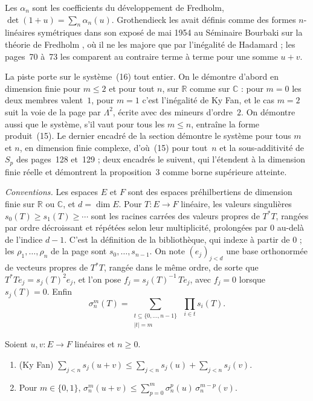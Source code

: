 Les $\alpha_n$ sont les coefficients du développement de Fredholm, $\det(1+u) = \sum_n \alpha_n(u)$. Grothendieck les avait définis comme des formes $n$-linéaires symétriques dans son exposé de mai 1954 au Séminaire Bourbaki sur la théorie de Fredholm \cite{sb91}, où il ne les majore que par l'inégalité de Hadamard ; les pages~70 à~73 les comparent au contraire terme à terme pour une somme $u+v$.

La piste porte sur le système~(16) tout entier. On le démontre d'abord en dimension finie pour $m \leq 2$ et pour tout $n$, sur $\mathbb R$ comme sur $\mathbb C$ : pour $m = 0$ les deux membres valent~$1$, pour $m = 1$ c'est l'inégalité de Ky Fan, et le cas $m = 2$ suit la voie de la page par $\Lambda^2$, écrite avec des mineurs d'ordre~$2$. On démontre aussi que le système, s'il vaut pour tous les $m \leq n$, entraîne la forme produit~(15). Le dernier encadré de la section démontre le système pour tous $m$ et $n$, en dimension finie complexe, d'où~(15) pour tout~$n$ et la sous-additivité de $S_p$ des pages~128 et~129 ; deux encadrés le suivent, qui l'étendent à la dimension finie réelle et démontrent la proposition~3 comme borne supérieure atteinte.

\noindent\emph{Conventions.} Les espaces $E$ et $F$ sont des espaces préhilbertiens de dimension finie sur $\mathbb R$ ou $\mathbb C$, et $d = \dim E$. Pour $T : E \to F$ linéaire, les valeurs singulières $s_0(T) \geq s_1(T) \geq \cdots$ sont les racines carrées des valeurs propres de $T^*T$, rangées par ordre décroissant et répétées selon leur multiplicité, prolongées par $0$ au-delà de l'indice $d - 1$. C'est la définition de la bibliothèque, qui indexe à partir de $0$ ; les $\rho_1, \ldots, \rho_n$ de la page sont $s_0, \ldots, s_{n-1}$. On note $(e_j)_{j < d}$ une base orthonormée de vecteurs propres de $T^*T$, rangée dans le même ordre, de sorte que $T^*T e_j = s_j(T)^2 e_j$, et l'on pose $f_j = s_j(T)^{-1}\, T e_j$, avec $f_j = 0$ lorsque $s_j(T) = 0$. Enfin
\[
  \sigma_n^m(T) = \sum_{\substack{t \subseteq \{0, \ldots, n-1\} \\ |t| = m}} \ \prod_{i \in t} s_i(T).
\]

\begin{enonce}
Soient $u, v : E \to F$ linéaires et $n \geq 0$.
\begin{enumerate}
\item (Ky Fan) $\displaystyle\sum_{j < n} s_j(u+v) \leq \sum_{j < n} s_j(u) + \sum_{j < n} s_j(v)$.
\item Pour $m \in \{0, 1\}$, $\sigma_n^m(u+v) \leq \sum_{p=0}^{m} \sigma_n^p(u)\,\sigma_n^{m-p}(v)$.
\end{enumerate}
\end{enonce}

